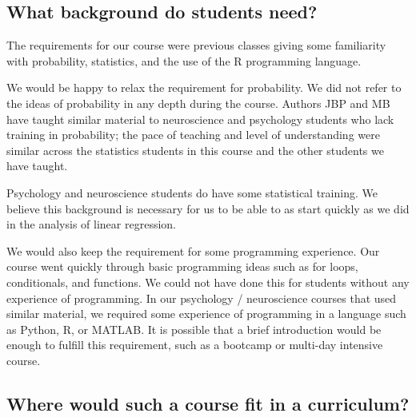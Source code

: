 



\subsection{What background do students need?}

The requirements for our course were previous classes giving some familiarity
with probability, statistics, and the use of the R programming language.

We would be happy to relax the requirement for probability.  We did not refer
to the ideas of probability in any depth during the course.  Authors JBP and
MB have taught similar material to neuroscience and psychology students who
lack training in probability; the pace of teaching and level of understanding
were similar across the statistics students in this course and the other
students we have taught.

Psychology and neuroscience students do have some statistical training.  We
believe this background is necessary for us to be able to as start quickly as
we did in the analysis of linear regression.

We would also keep the requirement for some programming experience.  Our
course went quickly through basic programming ideas such as for loops,
conditionals, and functions.  We could not have done this for students without
any experience of programming.  In our psychology / neuroscience courses that
used similar material, we required some experience of programming in a
language such as Python, R, or MATLAB.  It is possible that a brief
introduction would be enough to fulfill this requirement, such as a bootcamp
or multi-day intensive course.

\subsection{Where would such a course fit in a curriculum?}

